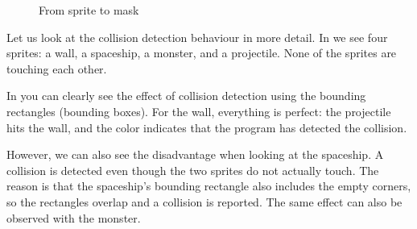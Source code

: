 \begin{itemize}
\begin{figure}[H]
\begin{center}
		\caption{From sprite to mask}\label{picKollMask02}
	\end{center}
\end{figure}


\end{itemize}


Let us look at the collision detection behaviour in more detail. In  we see four sprites: a wall, a spaceship, a monster, and a projectile. None of the sprites are touching each other.

In  you can clearly see the effect of collision detection using the bounding rectangles (bounding boxes). For the wall, everything is perfect: the projectile hits the wall, and the color indicates that the program has detected the collision.

However, we can also see the disadvantage when looking at the spaceship. A collision is detected even though the two sprites do not actually touch. The reason is that the spaceship’s bounding rectangle also includes the empty corners, so the rectangles overlap and a collision is reported. The same effect can also be observed with the monster.
 

